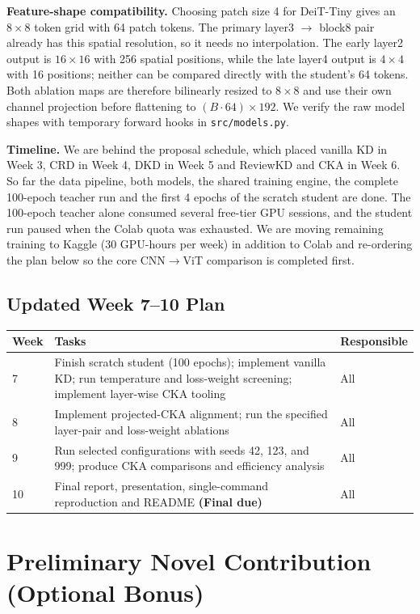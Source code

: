 \documentclass[11pt, letterpaper]{article}
\begin{document}
\textbf{Feature-shape compatibility.} Choosing patch size 4 for DeiT-Tiny gives
an $8\times8$ token grid with 64 patch tokens. The primary layer3 $\rightarrow$
block8 pair already has this spatial resolution, so it needs no interpolation.
The early layer2 output is $16\times16$ with 256 spatial positions, while the
late layer4 output is $4\times4$ with 16 positions; neither can be compared
directly with the student's 64 tokens. Both ablation maps are therefore
bilinearly resized to $8\times8$ and use their own channel projection before
flattening to $(B\cdot64)\times192$. We verify the raw model shapes with
temporary forward hooks in \texttt{src/models.py}.

\textbf{Timeline.} We are behind the proposal schedule, which placed vanilla
KD in Week 3, CRD in Week 4, DKD in Week 5 and ReviewKD and CKA in Week 6. So
far the data pipeline, both models, the shared training engine, the complete
100-epoch teacher run and the first 4 epochs of the scratch student are done.
The 100-epoch teacher alone consumed several free-tier GPU sessions, and the
student run paused when the Colab quota was exhausted. We are moving
remaining training to Kaggle (30 GPU-hours per week) in addition to Colab and
re-ordering the plan below so the core CNN$\rightarrow$ViT comparison is
completed first.

\subsection{Updated Week 7--10 Plan}

\small
\begin{tabularx}{\linewidth}{@{}p{0.7cm}Xp{1.2cm}@{}}
\toprule
\textbf{Week} & \textbf{Tasks} & \textbf{Responsible} \\
\midrule
7 & Finish scratch student (100 epochs); implement vanilla KD; run temperature and loss-weight screening; implement layer-wise CKA tooling & All \\
8 & Implement projected-CKA alignment; run the specified layer-pair and loss-weight ablations & All \\
9 & Run selected configurations with seeds 42, 123, and 999; produce CKA comparisons and efficiency analysis & All \\
10 & Final report, presentation, single-command reproduction and README \textbf{(Final due)} & All \\
\bottomrule
\end{tabularx}

\section{Preliminary Novel Contribution (Optional Bonus)}
\end{document}
